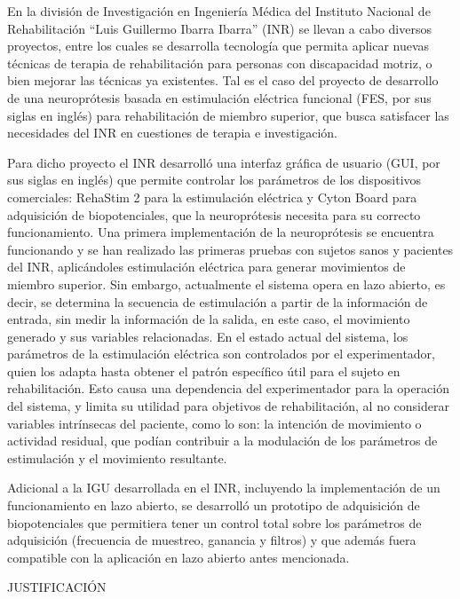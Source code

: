 
En la división de Investigación en Ingeniería Médica del Instituto Nacional de Rehabilitación ``Luis Guillermo Ibarra Ibarra'' (INR) se llevan a cabo diversos proyectos, entre los cuales se desarrolla tecnología que permita aplicar nuevas técnicas de terapia de rehabilitación para personas con discapacidad motriz, o bien mejorar las técnicas ya existentes. Tal es el caso del proyecto de desarrollo de una neuroprótesis basada en estimulación eléctrica funcional (FES, por sus siglas en inglés) para rehabilitación de miembro superior, que busca satisfacer las necesidades del INR en cuestiones de terapia e investigación.

Para dicho proyecto el INR desarrolló una interfaz gráfica de usuario (GUI, por sus siglas en inglés) que permite controlar los parámetros de los dispositivos comerciales: RehaStim 2 para la estimulación eléctrica y Cyton Board para adquisición de biopotenciales, que la neuroprótesis necesita para su correcto funcionamiento. Una primera implementación de la neuroprótesis se encuentra funcionando y se han realizado las primeras pruebas con sujetos sanos y pacientes del INR, aplicándoles estimulación eléctrica para generar movimientos de miembro superior. Sin embargo, actualmente el sistema opera en lazo abierto, es decir, se determina la secuencia de estimulación a partir de la información de entrada, sin medir la información de la salida, en este caso, el movimiento generado y sus variables relacionadas. En el estado actual del sistema, los parámetros de la estimulación eléctrica son controlados por el experimentador, quien los adapta hasta obtener el patrón específico útil para el sujeto en rehabilitación. Esto causa una dependencia del experimentador para la operación del sistema, y limita su utilidad para objetivos de rehabilitación, al no considerar variables intrínsecas del paciente, como lo son: la intención de movimiento o actividad residual, que podían contribuir a la modulación de los parámetros de estimulación y el movimiento resultante.

Adicional a la IGU desarrollada en el INR, incluyendo la implementación de un funcionamiento en lazo abierto, se desarrolló un prototipo de adquisición de biopotenciales que permitiera tener un control total sobre los parámetros de adquisición (frecuencia de muestreo, ganancia y filtros) y que además fuera compatible con la aplicación en lazo abierto antes mencionada.

{\color{blue}JUSTIFICACIÓN\\}

